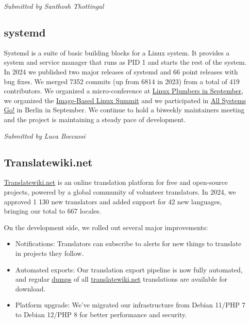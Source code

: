 \documentclass[a4paper]{report}
\begin{document}
{\em Submitted by Santhosh Thottingal}

\subsection{systemd}

Systemd is a suite of basic building blocks for a Linux system. It provides a system and service manager that runs as PID 1 and starts the rest of the system. In 2024 we published two major releases of systemd and 66 point releases with bug fixes. We merged 7352 commits (up from 6814 in 2023) from a total of 419 contributors. We organized a micro-conference at \href{https://lpc.events/event/18/sessions/206/#20240919}{Linux Plumbers in September}, we organized the \href{https://uapi-group.org/docs/minutes/2024-09-24__image-based-linux-summit/}{Image-Based Linux Summit} and we participated in \href{https://cfp.all-systems-go.io/all-systems-go-2024/schedule/}{All Systems Go!} in Berlin in September. We continue to hold a biweekly maintainers meeting and the project is maintaining a steady pace of development.

{\em Submitted by Luca Boccassi}

\subsection{Translatewiki.net}

\href{https://translatewiki.net/}{Translatewiki.net} is an online translation platform for free and open-source projects, powered by a global community of volunteer translators. In 2024, we approved 1 130 new translators and added support for 42 new languages, bringing our total to 667 locales.

On the development side, we rolled out several major improvements:

\begin{itemize}

\item Notifications: Translators can subscribe to alerts for new things to translate in projects they follow.
\item Automated exports: Our translation export pipeline is now fully automated, and regular \href{https://translatewiki.net/wiki/Dumps}{dumps} of all \href{https://translatewiki.net/}{translatewiki.net} translations are available for download.
\item Platform upgrade: We’ve migrated our infrastructure from Debian 11/PHP 7 to Debian 12/PHP 8 for better performance and security.

\end{itemize}
\end{document}
